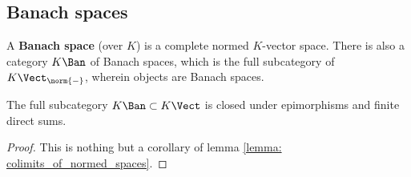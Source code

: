     \subsection{Banach spaces}
        \begin{definition} \label{def: banach_spaces}
            A \textbf{Banach space} (over $K$) is a complete normed $K$-vector space. There is also a category $K\-\Ban$ of Banach spaces, which is the full subcategory of $K\-\Vect_{\norm{-}}$, wherein objects are Banach spaces.
        \end{definition}
        \begin{example} \label{example: convergent_sequences}
            
        \end{example}
        \begin{example} \label{example: sequences_converging_to_zero}
            
        \end{example}
        \begin{example} \label{example: eventually_zero_sequences}
            
        \end{example}

        \begin{lemma} \label{lemma: colimits_of_banach_spaces}
            The full subcategory $K\-\Ban \subset K\-\Vect$ is closed under epimorphisms and finite direct sums. 
        \end{lemma}
            \begin{proof}
                This is nothing but a corollary of lemma \ref{lemma: colimits_of_normed_spaces}.
            \end{proof}
    
